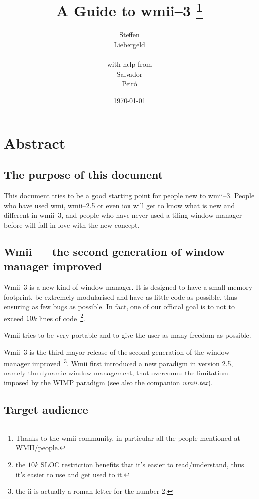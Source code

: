 \documentclass[12pt,a4paper]{article} %
\date{\today}
\author{
Steffen\\Liebergeld \\\\
\small{with help from}\\
Salvador\\Peir\'o
}
\title{A Guide to wmii--3%
\thanks{Thanks to the wmii community, in particular all the 
people mentioned at \href{http://wmii.de/index.php/WMII/People}{WMII/people}.}
}
\begin{document}
\maketitle

\tableofcontents

\newpage

\section{Abstract}

  \subsection{The purpose of this document}

    This document tries to be a good starting point for people new to
    wmii--3.  People who have used wmi, wmii--2.5 or even ion will get
    to know what is new and different in wmii--3, and people who have
    never used a tiling window manager before will fall in love with
    the new concept.
  
  \subsection{Wmii --- the second generation of window manager improved}

    Wmii--3 is a new kind of window manager. It is designed to have a
    small memory footprint, be extremely modularised and have as
    little code as possible, thus ensuring as few bugs as possible. In
    fact, one of our official goal is to not to exceed $10 k$ lines of
    code~\footnote{
    the $10 k$ SLOC restriction benefits that it's easier
    to read/understand, thus it's easier to use and get used to it.}.

    Wmii tries to be very portable and to give the user as many
    freedom as possible.

    Wmii--3 is the third mayor release of the second generation of the
    window manager improved~\footnote{ the ii is actually a roman
    letter for the number 2.}.  Wmii first introduced a new paradigm
    in version 2.5, namely the dynamic window management, that
    overcomes the limitations imposed by the WIMP paradigm (see also
    the companion \emph{wmii.tex}).
  
  \subsection{Target audience}
\end{document}
